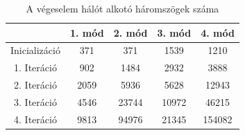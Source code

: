 \begin{table}[!h]
	\centering
	\begin{tabular}{|c||c|c|c|c|}
		\hline
				&1. mód&    2. mód&    3. mód&    4. mód\\ \hline\hline
		Inicializáció&371&371&1539&1210\\ \hline
		1. Iteráció&902&1484&2932&3888\\ \hline
		2. Iteráció&2059&5936&5628&12943\\ \hline
		3. Iteráció&4546&23744&10972&46215\\ \hline
		4. Iteráció&9813&94976&21345&154082\\ \hline
		
		
	\end{tabular}
	\caption{A végeselem hálót alkotó háromszögek száma}
	\label{tab:res-size}
\end{table}





















